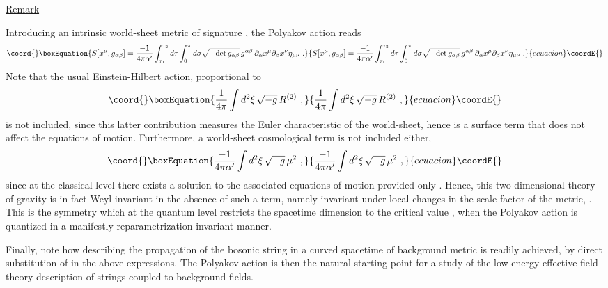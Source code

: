 \documentclass[a4paper,11pt]{article}
\begin{document}
\noindent\underline{Remark}

\vspace{5pt}

Introducing an intrinsic world-sheet metric \coordHE{} of
signature \myHighlight{$(-+)$}\coordHE{}, the Polyakov action reads
\begin{equation}\coord{}\boxEquation{
S[x^\mu,g_{\alpha\beta}]=\frac{-1}{4\pi\alpha'}
\int_{\tau_1}^{\tau_2}d\tau\int_0^\pi d\sigma\sqrt{-{\rm det}\,
g_{\alpha\beta}}\,g^{\alpha\beta}\,\partial_\alpha x^\mu\partial_\beta x^\nu
\eta_{\mu\nu}\ .
}{
S[x^\mu,g_{\alpha\beta}]=\frac{-1}{4\pi\alpha'}
\int_{\tau_1}^{\tau_2}d\tau\int_0^\pi d\sigma\sqrt{-{\rm det}\,
g_{\alpha\beta}}\,g^{\alpha\beta}\,\partial_\alpha x^\mu\partial_\beta x^\nu
\eta_{\mu\nu}\ .
}{ecuacion}\coordE{}\end{equation}
Note that the usual Einstein-Hilbert action, proportional to
\begin{equation}\coord{}\boxEquation{
\frac{1}{4\pi}\int d^2\xi\,\sqrt{-g}\,R^{(2)}\ ,
}{
\frac{1}{4\pi}\int d^2\xi\,\sqrt{-g}\,R^{(2)}\ ,
}{ecuacion}\coordE{}\end{equation}
is not included, since this latter contribution measures the Euler 
characteristic of the world-sheet, hence is a surface term that does not
affect the equations of motion. Furthermore, a world-sheet cosmological
term is not included either,
\begin{equation}\coord{}\boxEquation{
\frac{-1}{4\pi\alpha'}\int d^2\xi\,\sqrt{-g}\,\mu^2\ ,
}{
\frac{-1}{4\pi\alpha'}\int d^2\xi\,\sqrt{-g}\,\mu^2\ ,
}{ecuacion}\coordE{}\end{equation}
since at the classical level there exists a solution to the associated
equations of motion provided only \coordHE{}. Hence, this two-dimensional 
theory of gravity is in fact Weyl invariant in the absence of such a term, 
namely invariant under local changes in the scale factor of the metric,
\coordHE{}.
This is the symmetry which at the quantum level restricts
the spacetime dimension to the critical value \coordHE{}, when the Polyakov action
is quantized in a manifestly reparametrization invariant 
manner.\cite{Pol,GSW,JG10,JG11}

Finally, note how describing the propagation of the bosonic string
in a curved spacetime of background metric \coordHE{} is
readily achieved, by direct substitution of \myHighlight{$\eta_{\mu\nu}$}\coordHE{} in the above
expressions. The Polyakov action is then the natural starting point
for a study of the low energy effective field theory description of
strings coupled to background fields.\cite{Pol,GSW}
\end{document}
